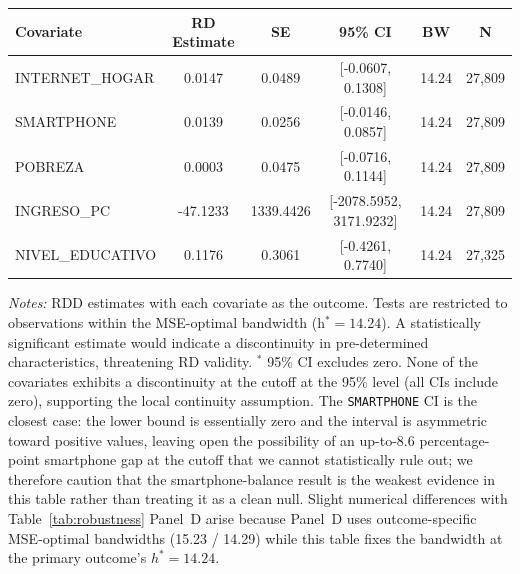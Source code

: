 \begin{threeparttable}
\begin{tabular}{l ccccc}
\toprule
Covariate & RD Estimate & SE & 95\% CI & BW & N \\
\midrule
  INTERNET\_HOGAR & 0.0147 & 0.0489 & [-0.0607, 0.1308] & 14.24 & 27{,}809 \\
  SMARTPHONE & 0.0139 & 0.0256 & [-0.0146, 0.0857] & 14.24 & 27{,}809 \\
  POBREZA & 0.0003 & 0.0475 & [-0.0716, 0.1144] & 14.24 & 27{,}809 \\
  INGRESO\_PC & -47.1233 & 1339.4426 & [-2078.5952, 3171.9232] & 14.24 & 27{,}809 \\
  NIVEL\_EDUCATIVO & 0.1176 & 0.3061 & [-0.4261, 0.7740] & 14.24 & 27{,}325 \\
\bottomrule
\end{tabular}
\begin{tablenotes}
\small
\item \textit{Notes:} RDD estimates with each covariate as the outcome. Tests are restricted to observations within the MSE-optimal bandwidth (h$^{\ast}\!=\!14.24$). A statistically significant estimate would indicate a discontinuity in pre-determined characteristics, threatening RD validity. $^{*}$ 95\% CI excludes zero. None of the covariates exhibits a discontinuity at the cutoff at the 95\% level (all CIs include zero), supporting the local continuity assumption. The \texttt{SMARTPHONE} CI is the closest case: the lower bound is essentially zero and the interval is asymmetric toward positive values, leaving open the possibility of an up-to-8.6 percentage-point smartphone gap at the cutoff that we cannot statistically rule out; we therefore caution that the smartphone-balance result is the weakest evidence in this table rather than treating it as a clean null. Slight numerical differences with Table~\ref{tab:robustness} Panel~D arise because Panel~D uses outcome-specific MSE-optimal bandwidths (15.23 / 14.29) while this table fixes the bandwidth at the primary outcome's $h^{\ast}\!=\!14.24$.
\end{tablenotes}
\end{threeparttable}